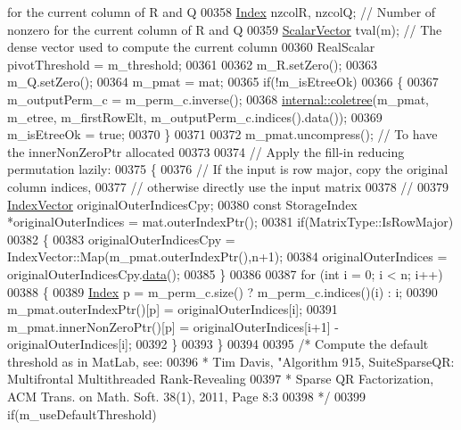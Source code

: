 \begin{DoxyCode}
{       for the current column of R and Q}
00358   \hyperlink{namespace_eigen_a62e77e0933482dafde8fe197d9a2cfde}{Index} nzcolR, nzcolQ;                                     \textcolor{comment}{// Number of nonzero for the current
       column of R and Q}
00359   \hyperlink{group___core___module}{ScalarVector} tval(m);                                     \textcolor{comment}{// The dense vector used to compute
       the current column}
00360   RealScalar pivotThreshold = m\_threshold;
00361   
00362   m\_R.setZero();
00363   m\_Q.setZero();
00364   m\_pmat = mat;
00365   \textcolor{keywordflow}{if}(!m\_isEtreeOk)
00366   \{
00367     m\_outputPerm\_c = m\_perm\_c.inverse();
00368     \hyperlink{namespace_eigen_1_1internal_a86181db74ba596a7afbfd89efcc5788c}{internal::coletree}(m\_pmat, m\_etree, m\_firstRowElt, m\_outputPerm\_c.indices().data());
00369     m\_isEtreeOk = \textcolor{keyword}{true};
00370   \}
00371 
00372   m\_pmat.uncompress(); \textcolor{comment}{// To have the innerNonZeroPtr allocated}
00373   
00374   \textcolor{comment}{// Apply the fill-in reducing permutation lazily:}
00375   \{
00376     \textcolor{comment}{// If the input is row major, copy the original column indices,}
00377     \textcolor{comment}{// otherwise directly use the input matrix}
00378     \textcolor{comment}{// }
00379     \hyperlink{group___core___module}{IndexVector} originalOuterIndicesCpy;
00380     \textcolor{keyword}{const} StorageIndex *originalOuterIndices = mat.outerIndexPtr();
00381     \textcolor{keywordflow}{if}(MatrixType::IsRowMajor)
00382     \{
00383       originalOuterIndicesCpy = IndexVector::Map(m\_pmat.outerIndexPtr(),n+1);
00384       originalOuterIndices = originalOuterIndicesCpy.\hyperlink{class_eigen_1_1_plain_object_base_ac25699535374b1854cf8494e44ad31b2}{data}();
00385     \}
00386     
00387     \textcolor{keywordflow}{for} (\textcolor{keywordtype}{int} i = 0; i < n; i++)
00388     \{
00389       \hyperlink{namespace_eigen_a62e77e0933482dafde8fe197d9a2cfde}{Index} p = m\_perm\_c.size() ? m\_perm\_c.indices()(i) : i;
00390       m\_pmat.outerIndexPtr()[p] = originalOuterIndices[i]; 
00391       m\_pmat.innerNonZeroPtr()[p] = originalOuterIndices[i+1] - originalOuterIndices[i]; 
00392     \}
00393   \}
00394   
00395   \textcolor{comment}{/* Compute the default threshold as in MatLab, see:}
00396 \textcolor{comment}{   * Tim Davis, "Algorithm 915, SuiteSparseQR: Multifrontal Multithreaded Rank-Revealing}
00397 \textcolor{comment}{   * Sparse QR Factorization, ACM Trans. on Math. Soft. 38(1), 2011, Page 8:3 }
00398 \textcolor{comment}{   */}
00399   \textcolor{keywordflow}{if}(m\_useDefaultThreshold) 

\end{DoxyCode}
